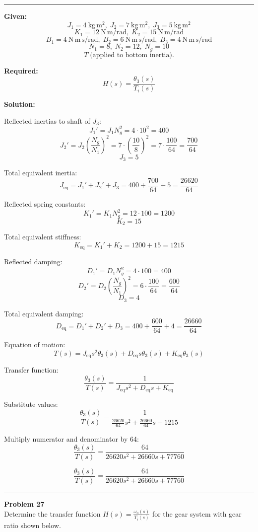 \noindent\rule{\textwidth}{1pt}

\textbf{Given:}
\[
J_1 = 4~\mathrm{kg\,m^2},\; J_2 = 7~\mathrm{kg\,m^2},\; J_3 = 5~\mathrm{kg\,m^2}
\]
\[
K_1 = 12~\mathrm{N\,m/rad},\; K_2 = 15~\mathrm{N\,m/rad}
\]
\[
B_1 = 4~\mathrm{N\,m\,s/rad},\; B_2 = 6~\mathrm{N\,m\,s/rad},\; B_3 = 4~\mathrm{N\,m\,s/rad}
\]
\[
N_1 = 8,\; N_2 = 12,\; N_g = 10
\]
\[
T \; \text{(applied to bottom inertia).}
\]

\textbf{Required:}
\[
H(s) = \frac{\theta_3(s)}{T_i(s)}
\]

\textbf{Solution:}

Reflected inertias to shaft of \( J_3 \):
\[
J_1' = J_1 N_g^2 = 4 \cdot 10^2 = 400
\]
\[
J_2' = J_2 \left( \frac{N_g}{N_1} \right)^2 = 7 \cdot \left( \frac{10}{8} \right)^2 = 7 \cdot \frac{100}{64} = \frac{700}{64}
\]
\[
J_3 = 5
\]

Total equivalent inertia:
\[
J_{\text{eq}} = J_1' + J_2' + J_3 = 400 + \frac{700}{64} + 5 = \frac{26620}{64}
\]

Reflected spring constants:
\[
K_1' = K_1 N_g^2 = 12 \cdot 100 = 1200
\]
\[
K_2 = 15
\]

Total equivalent stiffness:
\[
K_{\text{eq}} = K_1' + K_2 = 1200 + 15 = 1215
\]

Reflected damping:
\[
D_1' = D_1 N_g^2 = 4 \cdot 100 = 400
\]
\[
D_2' = D_2 \left( \frac{N_g}{N_1} \right)^2 = 6 \cdot \frac{100}{64} = \frac{600}{64}
\]
\[
D_3 = 4
\]

Total equivalent damping:
\[
D_{\text{eq}} = D_1' + D_2' + D_3 = 400 + \frac{600}{64} + 4 = \frac{26660}{64}
\]

Equation of motion:
\[
T(s) = J_{\text{eq}} s^2 \theta_3(s) + D_{\text{eq}} s \theta_3(s) + K_{\text{eq}} \theta_3(s)
\]

Transfer function:
\[
\frac{\theta_3(s)}{T(s)} = \frac{1}{J_{\text{eq}} s^2 + D_{\text{eq}} s + K_{\text{eq}}}
\]

Substitute values:
\[
\frac{\theta_3(s)}{T(s)} = \frac{1}{\frac{26620}{64} s^2 + \frac{26660}{64} s + 1215}
\]

Multiply numerator and denominator by 64:
\[
\frac{\theta_3(s)}{T(s)} = \frac{64}{26620 s^2 + 26660 s + 77760}
\]

\[
\boxed{\frac{\theta_3(s)}{T(s)} = \frac{64}{26620 s^2 + 26660 s + 77760}}
\]

\newpage

\noindent\rule{\textwidth}{1pt}
\noindent\textbf{Problem 27} \hfill
\\ Determine the transfer function \(H(s) = \frac{\omega_o(s)}{T_i(s)}\) for the gear system with gear ratio shown below.

